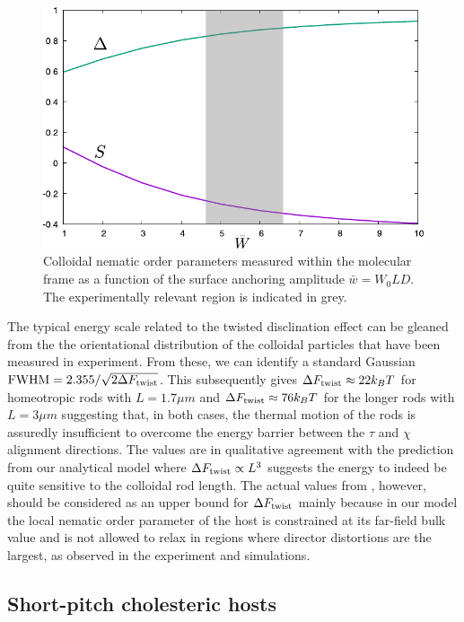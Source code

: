 \begin{figure}
	\includegraphics[width = .8\columnwidth]{figures/chapter-3/wwmans}
	\caption{ Colloidal nematic order parameters measured within the molecular frame as a function of
the surface anchoring amplitude $\bar{w} = W_{0}LD$. The experimentally relevant region is indicated in grey. }
	\label{ww}
\end{figure}



The typical energy scale related to the twisted disclination effect can be gleaned from the the orientational distribution of the colloidal particles that have been measured in experiment.  From these, we can identify a standard Gaussian ${\rm FWHM} =2.355/\sqrt{2 \Delta F_{\rm twist}}$. This subsequently gives $\Delta F_{\rm twist} \approx 22 k_{B}T$ for homeotropic rods with  $L  = 1.7 \mu m $  and $\Delta F_{\rm twist} \approx 76 k_{B}T$  for the longer rods  with $L  = 3 \mu m $ suggesting that, in both cases, the thermal motion of the rods is assuredly insufficient to overcome the energy barrier between the $\tau$ and $\chi$ alignment directions. The values are in qualitative agreement with the prediction from our analytical model  where $\Delta F_{\rm twist} \propto L^{3}$ suggests the energy to indeed be quite sensitive to the colloidal rod length. The actual values from  , however, should be considered as an upper bound for $\Delta F_{\rm twist}$ mainly because in our model the local nematic order parameter of the host is constrained at its far-field bulk value and is not allowed to relax in regions where director distortions are the largest, as observed in the experiment and simulations. 








\subsection{Short-pitch cholesteric hosts}


